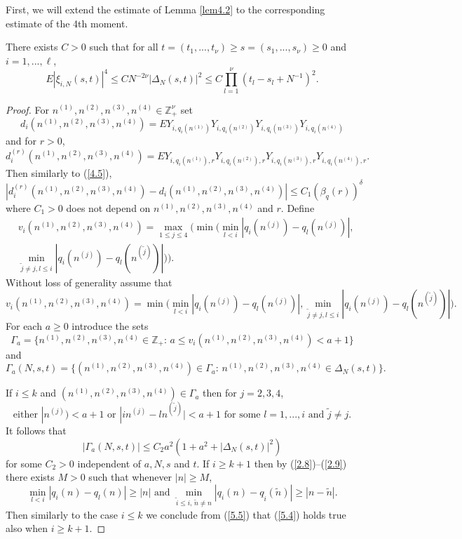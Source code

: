 First, we will extend the estimate of Lemma \ref{lem4.2} to the corresponding
estimate of the 4th moment.
\begin{lemma}\label{lem5.1} There exists $C>0$ such that for all $t=(t_1,...,
t_\nu)\geq s=(s_1,...,s_\nu)\geq 0$ and $i=1,...,\ell$,
\begin{equation}\label{5.1}
 E|\xi_{i,N}(s,t)|^4\le CN^{-2\nu}|{{\Delta}}_N(s,t)|^2\le C\prod_{l=1}^\nu (t_l-s_l
 +N^{-1})^2.
\end{equation}
\end{lemma}
\begin{proof}
For $n^{(1)},n^{(2)},n^{(3)},n^{(4)}\in{{\mathbb Z}}^\nu_+$ set 
\[
d_i(n^{(1)},n^{(2)},n^{(3)},n^{(4)})=EY_{i,q_i(n^{(1)})}Y_{i,q_i(n^{(2)})}
Y_{i,q_i(n^{(3)})}Y_{i,q_i(n^{(4)})}
\]
and for $r>0$,
\[
d_i^{(r)}(n^{(1)},n^{(2)},n^{(3)},n^{(4)})=EY_{i,q_i(n^{(1)}),r}
Y_{i,q_i(n^{(2)}),r}Y_{i,q_i(n^{(3)}),r}Y_{i,q_i(n^{(4)}),r}.
\]
Then similarly to (\ref{4.5}),
\begin{equation}\label{5.2}
|d_i^{(r)}(n^{(1)},n^{(2)},n^{(3)},n^{(4)})-d_i(n^{(1)},n^{(2)},n^{(3)},
n^{(4)})|\leq C_1({{\beta}}_q(r))^{{\delta}}
\end{equation}
where $C_1>0$ does not depend on $n^{(1)},n^{(2)},n^{(3)},n^{(4)}$ and $r$.
Define
\begin{eqnarray*}
&v_i(n^{(1)},n^{(2)},n^{(3)},n^{(4)})=\max_{1\leq j\leq 4}\big(\min
\big(\min_{l<i}|q_i(n^{(j)})-q_l(n^{(j)})|,\\
&\min_{\tilde j\ne j,l\leq i}|q_i(n^{(j)})-q_l(n^{(\tilde j)})|\big)\big).
\end{eqnarray*}
Without loss of generality assume that
\begin{equation}\label{5.3}
v_i(n^{(1)},n^{(2)},n^{(3)},n^{(4)})=\min\big(\min_{l<i}|q_i(n^{(j)})-
q_l(n^{(j)})|,\min_{\tilde j\ne j,l\leq i}|q_i(n^{(j)})-q_l(n^{(\tilde j)})|
\big).
\end{equation}
For each $a\geq 0$ introduce the sets
\[
{{\Gamma}}_a=\{ n^{(1)},n^{(2)},n^{(3)},n^{(4)}\in{{\mathbb Z}}_+:\, a\leq v_i(n^{(1)},
n^{(2)},n^{(3)},n^{(4)})<a+1\}
\]
and
\[
{{\Gamma}}_a(N,s,t)=\{ (n^{(1)},n^{(2)},n^{(3)},n^{(4)})\in{{\Gamma}}_a:\, 
n^{(1)},n^{(2)},n^{(3)},n^{(4)}\in{{\Delta}}_N(s,t)\}.
\]

If $i\leq k$ and $(n^{(1)},n^{(2)},n^{(3)},n^{(4)})\in{{\Gamma}}_a$ then for 
$j=2,3,4$,
\[
\mbox{either}\,\, |n^{(j)})<a+1\,\,\mbox{or}\,\, |in^{(j)}-ln^{(\tilde j)}|
<a+1\,\,\mbox{for some}\,\, l=1,...,i\,\,\mbox{and}\,\,\tilde j\ne j.
\]
It follows that
\begin{equation}\label{5.4}
|{{\Gamma}}_a(N,s,t)|\leq C_2a^2(1+a^2+|{{\Delta}}_N(s,t)|^2)
\end{equation}
for some $C_2>0$ independent of $a,N,s$ and $t$. If $i\geq k+1$ then by
(\ref{2.8})--(\ref{2.9}) there exists $M>0$ such that whenever $|n|\geq M$,
\begin{equation}\label{5.5}
\min_{l<i}|q_i(n)-q_l(n)|\geq |n|\,\,\mbox{and}\,\,\min_{\tilde i\leq i,\,
\tilde n\ne n}|q_i(n)-q_{\tilde i}(\tilde n)|\geq |n-\tilde n|.
\end{equation}
Then similarly to the case $i\leq k$ we conclude from (\ref{5.5}) that 
(\ref{5.4}) holds true also when $i\geq k+1$.


\end{proof}
